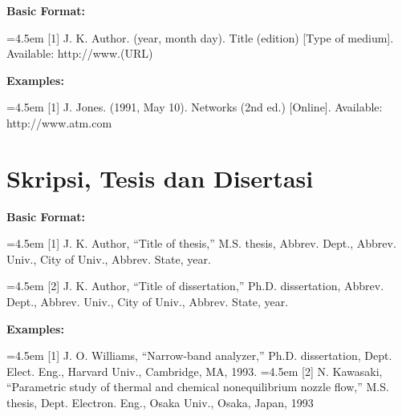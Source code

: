 \textbf{Basic Format:}

\hangindent=4.5em
[1] J. K. Author. (year, month day). Title (edition) [Type of medium]. Available: 
http://www.(URL)

\textbf{Examples:}

\hangindent=4.5em
[1] J. Jones. (1991, May 10). Networks (2nd ed.) [Online]. Available: 
http://www.atm.com

\section*{Skripsi, Tesis dan Disertasi}

\textbf{Basic Format:}

\hangindent=4.5em
[1] J. K. Author, “Title of thesis,” M.S. thesis, Abbrev. Dept., Abbrev. Univ., City of Univ., Abbrev. State, year.

\hangindent=4.5em
[2] J. K. Author, “Title of dissertation,” Ph.D. dissertation, Abbrev. Dept., Abbrev. Univ., City of Univ., Abbrev. State, year.

\textbf{Examples:}

\hangindent=4.5em
[1] J. O. Williams, “Narrow-band analyzer,” Ph.D. dissertation, Dept. Elect. Eng., 
Harvard Univ., Cambridge, MA, 1993.
\hangindent=4.5em
[2] N. Kawasaki, “Parametric study of thermal and chemical nonequilibrium nozzle 
flow,” M.S. thesis, Dept. Electron. Eng., Osaka Univ., Osaka, Japan, 1993